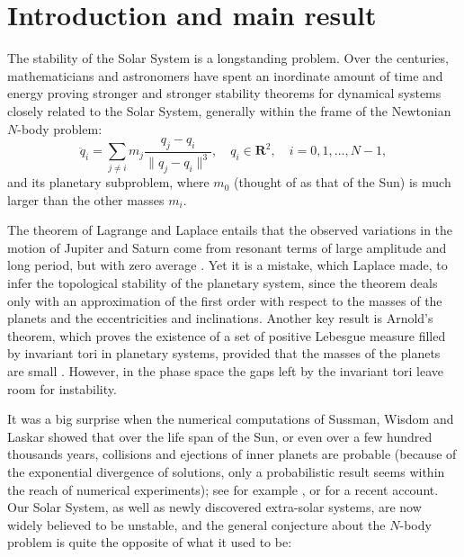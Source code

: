 

\section{Introduction and main result}\label{sec:Intro}

The stability of the Solar System is a longstanding problem.  Over the
centuries, mathematicians and astronomers have spent an inordinate
amount of time and energy proving stronger and stronger stability
theorems for dynamical systems closely related to the
Solar System, generally within the frame of the Newtonian $N$-body
problem:
\begin{equation}\label{eq:nBodyProblem}
  \ddot q_i = \sum_{j \neq i} m_j \frac{q_j - q_i}{\|q_j-q_i\|^3},
  \quad q_i \in \mathbf{R}^2, \quad i=0,1,...,N-1,
\end{equation}
and its planetary subproblem, where $m_0$ (thought of as that of the
Sun) is much larger than the other masses $m_i$.

The theorem of Lagrange and Laplace entails that the observed
variations in the motion of Jupiter and Saturn come from resonant
terms of large amplitude and long period, but with zero average
\cite[p.~164]{Laplace:1785}. Yet it is a mistake, which Laplace made,
to infer the topological stability of the planetary system, since the
theorem deals only with an approximation of the first order with
respect to the masses of the planets and the eccentricities and
inclinations. Another key result is Arnold's theorem, which proves the
existence of a set of positive Lebesgue measure filled by invariant tori
in planetary systems, provided that the masses of the planets are
small \cite{Arnold:1963, Fejoz:2004}. However, in the phase space
the gaps left by the invariant tori leave  room  for  instability.


It was a big surprise when the numerical computations of Sussman, Wisdom and Laskar showed that over the life span of the Sun, or even over
a few hundred thousands
years, collisions and ejections of inner planets are probable
(because of the exponential divergence of solutions, only a
probabilistic result seems within the reach of numerical experiments);
see for example \cite{Sussman:1992, Laskar:1994}, or \cite{Laskar:2010}
for a recent account. Our Solar System, as well
as newly discovered extra-solar systems, are now widely believed to be
unstable, and the general conjecture about the $N$-body problem is
quite the opposite of what it used to be:

